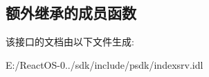\subsection*{额外继承的成员函数}


该接口的文档由以下文件生成\+:\begin{DoxyCompactItemize}
\item 
E\+:/\+React\+O\+S-\/0../sdk/include/psdk/indexsrv.\+idl\end{DoxyCompactItemize}
